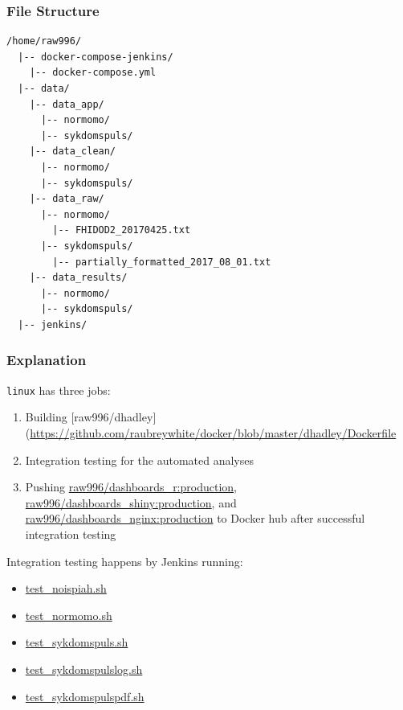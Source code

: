 \documentclass[12pt,]{article}
\providecommand{\tightlist}{%
  \setlength{\itemsep}{0pt}\setlength{\parskip}{0pt}}
\begin{document}
\subsubsection{File Structure}\label{file-structure-1}

\begin{verbatim}
/home/raw996/
  |-- docker-compose-jenkins/
    |-- docker-compose.yml
  |-- data/
    |-- data_app/
      |-- normomo/
      |-- sykdomspuls/
    |-- data_clean/
      |-- normomo/
      |-- sykdomspuls/
    |-- data_raw/
      |-- normomo/
        |-- FHIDOD2_20170425.txt
      |-- sykdomspuls/
        |-- partially_formatted_2017_08_01.txt
    |-- data_results/
      |-- normomo/
      |-- sykdomspuls/
  |-- jenkins/
\end{verbatim}

\subsubsection{Explanation}\label{explanation-1}

\texttt{linux} has three jobs:

\begin{enumerate}
\def\labelenumi{\arabic{enumi}.}
\tightlist
\item
  Building
  {[}raw996/dhadley{]}(\url{https://github.com/raubreywhite/docker/blob/master/dhadley/Dockerfile}
\item
  Integration testing for the automated analyses
\item
  Pushing
  \href{https://hub.docker.com/r/raw996/dashboards_r/}{raw996/dashboards\_r:production},
  \href{https://hub.docker.com/r/raw996/dashboards_shiny/}{raw996/dashboards\_shiny:production},
  and
  \href{https://hub.docker.com/r/raw996/dashboards_nginx/}{raw996/dashboards\_nginx:production}
  to Docker hub after successful integration testing
\end{enumerate}

Integration testing happens by Jenkins running:

\begin{itemize}
\tightlist
\item
  \href{https://github.com/raubreywhite/dashboards_control/blob/master/bin/test_noispiah.sh}{test\_noispiah.sh}
\item
  \href{https://github.com/raubreywhite/dashboards_control/blob/master/bin/test_normomo.sh}{test\_normomo.sh}
\item
  \href{https://github.com/raubreywhite/dashboards_control/blob/master/bin/test_sykdomspuls.sh}{test\_sykdomspuls.sh}
\item
  \href{https://github.com/raubreywhite/dashboards_control/blob/master/bin/test_sykdomspulslog.sh}{test\_sykdomspulslog.sh}
\item
  \href{https://github.com/raubreywhite/dashboards_control/blob/master/bin/test_sykdomspulspdf.sh}{test\_sykdomspulspdf.sh}
\end{itemize}
\end{document}
